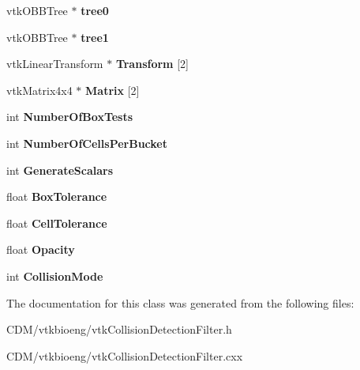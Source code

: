 \begin{DoxyCompactItemize}
\item 
\hypertarget{classvtkCollisionDetectionFilter_a28848f7b1523685e8be9c4a79e4cd3fa}{
vtkOBBTree $\ast$ {\bfseries tree0}}
\label{classvtkCollisionDetectionFilter_a28848f7b1523685e8be9c4a79e4cd3fa}

\item 
\hypertarget{classvtkCollisionDetectionFilter_a1a9f9ae715ab6f48cc63369135475436}{
vtkOBBTree $\ast$ {\bfseries tree1}}
\label{classvtkCollisionDetectionFilter_a1a9f9ae715ab6f48cc63369135475436}

\item 
\hypertarget{classvtkCollisionDetectionFilter_a7ac50b7fa9d033957664ec719c31145d}{
vtkLinearTransform $\ast$ {\bfseries Transform} \mbox{[}2\mbox{]}}
\label{classvtkCollisionDetectionFilter_a7ac50b7fa9d033957664ec719c31145d}

\item 
\hypertarget{classvtkCollisionDetectionFilter_a96f3f80b22fe08dc1c98f926f5fb4d32}{
vtkMatrix4x4 $\ast$ {\bfseries Matrix} \mbox{[}2\mbox{]}}
\label{classvtkCollisionDetectionFilter_a96f3f80b22fe08dc1c98f926f5fb4d32}

\item 
\hypertarget{classvtkCollisionDetectionFilter_a0b76689833c410bdd599fe524c1e8a48}{
int {\bfseries NumberOfBoxTests}}
\label{classvtkCollisionDetectionFilter_a0b76689833c410bdd599fe524c1e8a48}

\item 
\hypertarget{classvtkCollisionDetectionFilter_ab3ea026891098a34c424cfe3e8da8099}{
int {\bfseries NumberOfCellsPerBucket}}
\label{classvtkCollisionDetectionFilter_ab3ea026891098a34c424cfe3e8da8099}

\item 
\hypertarget{classvtkCollisionDetectionFilter_adebd08c9c3f88af0e72fd61a93622e97}{
int {\bfseries GenerateScalars}}
\label{classvtkCollisionDetectionFilter_adebd08c9c3f88af0e72fd61a93622e97}

\item 
\hypertarget{classvtkCollisionDetectionFilter_a618d57b104119551e09f2226ea4112d8}{
float {\bfseries BoxTolerance}}
\label{classvtkCollisionDetectionFilter_a618d57b104119551e09f2226ea4112d8}

\item 
\hypertarget{classvtkCollisionDetectionFilter_a34a43db5f87fb8ac63d58287bf4edf9d}{
float {\bfseries CellTolerance}}
\label{classvtkCollisionDetectionFilter_a34a43db5f87fb8ac63d58287bf4edf9d}

\item 
\hypertarget{classvtkCollisionDetectionFilter_ac6036b5ed3c72e577aae12546fc33431}{
float {\bfseries Opacity}}
\label{classvtkCollisionDetectionFilter_ac6036b5ed3c72e577aae12546fc33431}

\item 
\hypertarget{classvtkCollisionDetectionFilter_ae025cca9834e7d8c96ee406efd31676e}{
int {\bfseries CollisionMode}}
\label{classvtkCollisionDetectionFilter_ae025cca9834e7d8c96ee406efd31676e}

\end{DoxyCompactItemize}


The documentation for this class was generated from the following files:\begin{DoxyCompactItemize}
\item 
CDM/vtkbioeng/vtkCollisionDetectionFilter.h\item 
CDM/vtkbioeng/vtkCollisionDetectionFilter.cxx\end{DoxyCompactItemize}
